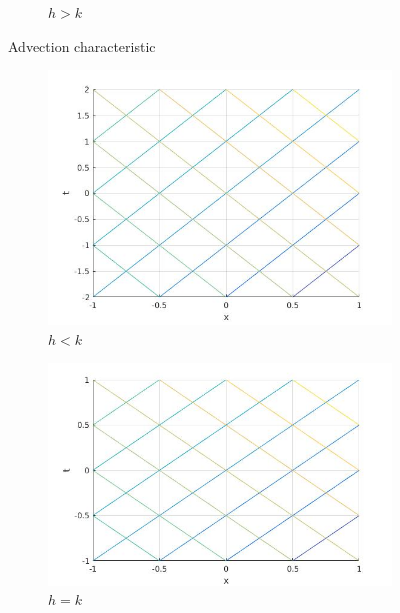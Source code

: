 \begin{figure}[H]
\begin{subfigure}[b]{0.3\textwidth}
  \caption{$h>k$}
  \label{fig:aci3}
\end{subfigure}
\caption{Advection characteristic}
\label{fig:advcoordimg}
\end{figure}
\begin{figure}[H]
\centering
\begin{subfigure}[b]{0.3\textwidth}
  \centering
  \includegraphics[width=\textwidth]{Images/wave_hlk.jpg}
  \caption{$h<k$}
  \label{fig:wci1}
\end{subfigure}
\hfill
\begin{subfigure}[b]{0.3\textwidth}
  \includegraphics[width=\textwidth]{Images/wave_h=k.jpg}
  \caption{$h=k$}
  \label{fig:wci2}
\end{subfigure}
\hfill
\begin{subfigure}[b]{0.3\textwidth}

\end{subfigure}
\end{figure}
